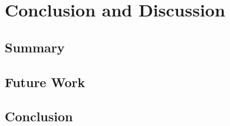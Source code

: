 
\chapter{Conclusion and Discussion}\label{chapter:conclusion}

\section{Summary}
\section{Future Work}
\section{Conclusion}